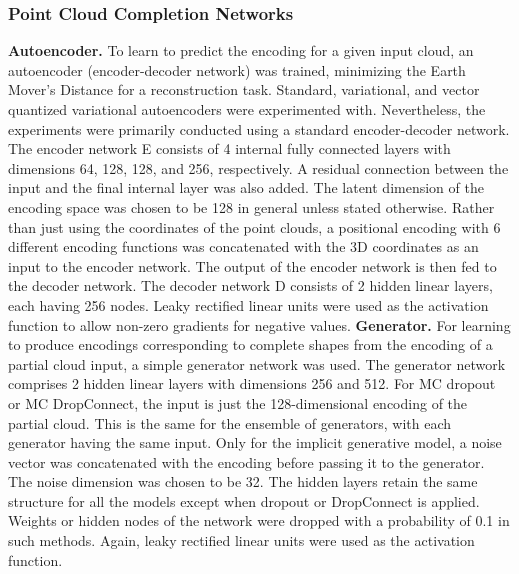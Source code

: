         \subsubsection{Point Cloud Completion Networks}
        \textbf{Autoencoder.} 
        To learn to predict the encoding for a given input cloud, an autoencoder (encoder-decoder network) was trained, minimizing the Earth Mover's Distance for a reconstruction task. Standard, variational, and vector quantized variational autoencoders were experimented with. Nevertheless, the experiments were primarily conducted using a standard encoder-decoder network. The encoder network E consists of 4 internal fully connected layers with dimensions 64, 128, 128, and 256, respectively. A residual connection between the input and the final internal layer was also added. The latent dimension of the encoding space was chosen to be 128 in general unless stated otherwise. Rather than just using the coordinates of the point clouds, a positional encoding with 6 different encoding functions was concatenated with the 3D coordinates as an input to the encoder network. The output of the encoder network is then fed to the decoder network. The decoder network D consists of 2 hidden linear layers, each having 256 nodes. Leaky rectified linear units were used as the activation function to allow non-zero gradients for negative values.
        \newline \textbf{Generator.}
        For learning to produce encodings corresponding to complete shapes from the encoding of a partial cloud input, a simple generator network was used. The generator network comprises 2 hidden linear layers with dimensions 256 and 512. For MC dropout or MC DropConnect, the input is just the 128-dimensional encoding of the partial cloud. This is the same for the ensemble of generators, with each generator having the same input. Only for the implicit generative model, a noise vector was concatenated with the encoding before passing it to the generator. The noise dimension was chosen to be 32. The hidden layers retain the same structure for all the models except when dropout or DropConnect is applied. Weights or hidden nodes of the network were dropped with a probability of 0.1 in such methods. Again, leaky rectified linear units were used as the activation function.
        
